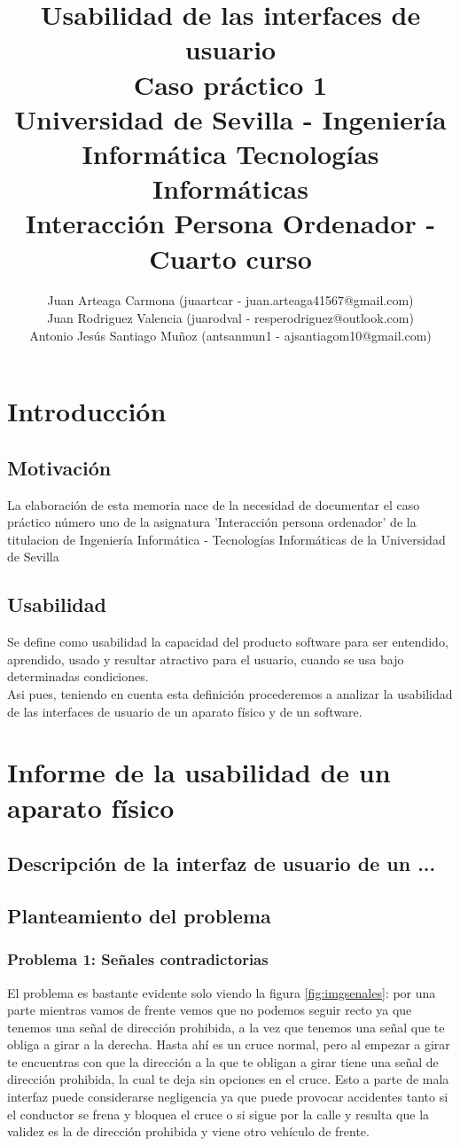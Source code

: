\documentclass[a4paper,11pt]{article}
\title{
        \textbf{Usabilidad de las interfaces de usuario}\large\\
        \textbf{Caso práctico 1}\\
        \medskip
        Universidad de Sevilla - Ingeniería Informática Tecnologías Informáticas\\
        Interacción Persona Ordenador - Cuarto curso}
\author{Juan Arteaga Carmona (juaartcar - juan.arteaga41567@gmail.com)\\
        Juan Rodriguez Valencia (juarodval - resperodriguez@outlook.com)\\
        Antonio Jesús Santiago Muñoz (antsanmun1 - ajsantiagom10@gmail.com)\\
}
\begin{document}
\maketitle


\newpage
\tableofcontents
\listoffigures
\newpage

\section{Introducción}
\subsection{Motivación}
La elaboración de esta memoria nace de la necesidad de documentar el caso práctico número uno de la asignatura 'Interacción persona ordenador' de la titulacion de Ingeniería Informática - Tecnologías Informáticas de la Universidad de Sevilla
\subsection{Usabilidad}
Se define como usabilidad la capacidad del producto software para ser entendido, aprendido, usado y resultar atractivo para el usuario, cuando se usa bajo determinadas condiciones. \cite{diapTema1} \cite{iso25010}\\
Asi pues, teniendo en cuenta esta definición procederemos a analizar la usabilidad de las interfaces de usuario de un aparato físico y de un software.

\section{Informe de la usabilidad de un aparato físico}
\subsection{Descripción de la interfaz de usuario de un ... }
\subsection{Planteamiento del problema}
\subsubsection{Problema 1: Señales contradictorias}
El problema es bastante evidente solo viendo la figura \ref{fig:imgsenales}: por una parte mientras vamos de frente vemos que no podemos seguir recto ya que tenemos una señal de dirección prohibida, a la vez que tenemos una señal que te obliga a girar a la derecha. Hasta ahí es un cruce normal, pero al empezar a girar te encuentras con que la dirección a la que te obligan a girar tiene una señal de dirección prohibida, la cual te deja sin opciones en el cruce. Esto a parte de mala interfaz puede considerarse negligencia ya que puede provocar accidentes tanto si el conductor se frena y bloquea el cruce o si sigue por la calle y resulta que la validez es la de dirección prohibida y viene otro vehículo de frente.
\end{document}
